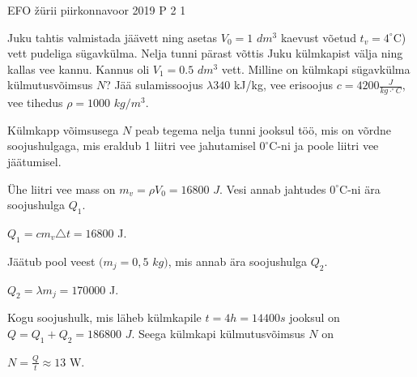 {EFO žürii} %
{piirkonnavoor} %
{2019} %
{P 2} %
{1} %
{

\ifStatement
Juku tahtis valmistada jäävett ning asetas $V_0 = 1$ $dm^3$ kaevust võetud $t_v = 4^{\circ}$C) vett pudeliga sügavkülma. Nelja tunni pärast võttis Juku külmkapist välja ning kallas vee kannu. Kannus oli $V_1 = 0.5$ $dm^3$ vett. Milline on külmkapi sügavkülma külmutusvõimsus $N$? Jää sulamissoojus $\lambda 340$ kJ/kg, vee erisoojus $c = 4200 \frac{J}{kg \cdot ^{\circ}C}$, vee tihedus $\rho = 1000$ $kg/m^3$.
\fi

\ifHint
Külmkapp võimsusega $N$ peab tegema nelja tunni jooksul töö, mis on võrdne soojushulgaga, mis eraldub 1 liitri vee jahutamisel $ 0^{\circ}$C-ni ja poole liitri vee jäätumisel.
\fi

\ifSolution
Ühe liitri vee mass on $m_v = \rho V_0 = 16800$ $J$. Vesi annab jahtudes $0^{\circ}$C-ni ära soojushulga $Q_1$.
\begin{center}
$Q_1 = cm_v \triangle t = 16800$ J.
\end{center}
Jäätub pool veest $(m_j = 0,5$ $kg)$, mis annab ära soojushulga $Q_2$.
\begin{center}
$Q_2 = \lambda m_j = 170 000$ J.
\end{center}
Kogu soojushulk, mis läheb külmkapile $t= 4h = 14 400s$ jooksul on $Q = Q_1 + Q_2 = 186 800$ $J$.
Seega külmkapi külmutusvõimsus $N$ on 
\begin{center}
$N=\frac{Q}{t} \approx 13$ W.
\end{center}
\fi
}